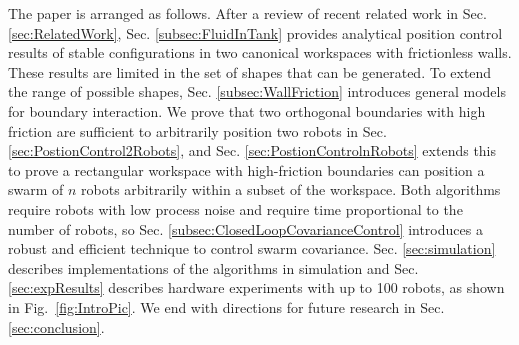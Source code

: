 The paper is arranged as follows. 
After a review of recent related work in Sec.  \ref{sec:RelatedWork},
 Sec. \ref{subsec:FluidInTank} provides analytical position control results of stable configurations in two canonical workspaces with frictionless walls.  These results are limited in the set of shapes that can be generated.  To extend the range of possible shapes, Sec.  \ref{subsec:WallFriction} introduces general models for boundary interaction.  We prove that two orthogonal boundaries with high friction are sufficient to arbitrarily position two robots in Sec.  \ref{sec:PostionControl2Robots}, and Sec.  \ref{sec:PostionControlnRobots} extends this to prove a rectangular workspace with high-friction boundaries can position a swarm of $n$ robots arbitrarily within a subset of the workspace.
Both algorithms require robots with low process noise and require time proportional to the number of robots, so Sec.  \ref{subsec:ClosedLoopCovarianceControl} introduces a robust and efficient technique to control swarm covariance.
Sec.  \ref{sec:simulation} describes implementations of the algorithms in simulation and  Sec.  \ref{sec:expResults} describes hardware experiments with up to 100 robots, as shown in Fig.~\ref{fig:IntroPic}.  We end with directions for future research in Sec.  \ref{sec:conclusion}.
